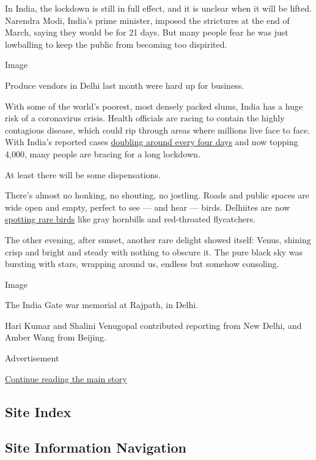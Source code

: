 In India, the lockdown is still in full effect, and it is unclear when
it will be lifted. Narendra Modi, India's prime minister, imposed the
strictures at the end of March, saying they would be for 21 days. But
many people fear he was just lowballing to keep the public from becoming
too dispirited.

Image

Produce vendors in Delhi last month were hard up for business.

With some of the world's poorest, most densely packed slums, India has a
huge risk of a coronavirus crisis. Health officials are racing to
contain the highly contagious disease, which could rip through areas
where millions live face to face. With India's reported cases
\href{https://www.ndtv.com/india-news/coronavirus-india-covid-19-cases-doubling-every-4-days-set-to-touch-17-000-in-a-week-2207289}{doubling
around every four days} and now topping 4,000, many people are bracing
for a long lockdown.

At least there will be some dispensations.

There's almost no honking, no shouting, no jostling. Roads and public
spaces are wide open and empty, perfect to see --- and hear --- birds.
Delhiites are now
\href{https://timesofindia.indiatimes.com/city/delhi/role-reversal-with-humans-caged-in-birds-fill-the-silence-as-sightings-go-up/articleshow/74975750.cms}{spotting
rare birds} like gray hornbills and red-throated flycatchers.

The other evening, after sunset, another rare delight showed itself:
Venus, shining crisp and bright and steady with nothing to obscure it.
The pure black sky was bursting with stars, wrapping around us, endless
but somehow consoling.

Image

The India Gate war memorial at Rajpath, in Delhi.

Hari Kumar and Shalini Venugopal contributed reporting from New Delhi,
and Amber Wang from Beijing.

Advertisement

\protect\hyperlink{after-bottom}{Continue reading the main story}

\hypertarget{site-index}{%
\subsection{Site Index}\label{site-index}}

\hypertarget{site-information-navigation}{%
\subsection{Site Information
Navigation}\label{site-information-navigation}}

